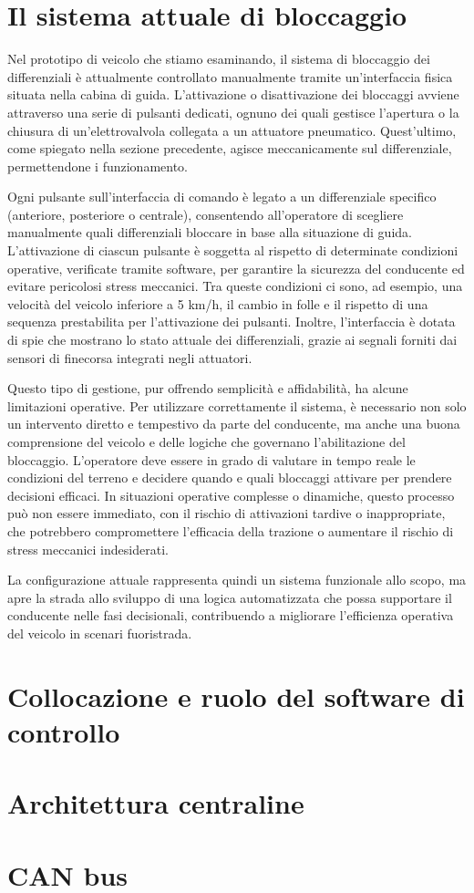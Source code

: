 \documentclass[11pt]{report}
\begin{document}
	\section{Il sistema attuale di bloccaggio}
	Nel prototipo di veicolo che stiamo esaminando, il sistema di bloccaggio dei differenziali è attualmente controllato manualmente tramite un'interfaccia fisica situata nella cabina di guida. L'attivazione o disattivazione dei bloccaggi avviene attraverso una serie di pulsanti dedicati, ognuno dei quali gestisce l'apertura o la chiusura di un'elettrovalvola collegata a un attuatore pneumatico. Quest'ultimo, come spiegato nella sezione precedente, agisce meccanicamente sul differenziale, permettendone i funzionamento.
	
	Ogni pulsante sull'interfaccia di comando è legato a un differenziale specifico (anteriore, posteriore o centrale), consentendo all'operatore di scegliere manualmente quali differenziali bloccare in base alla situazione di guida. L'attivazione di ciascun pulsante è soggetta al rispetto di determinate condizioni operative, verificate tramite software, per garantire la sicurezza del conducente ed evitare pericolosi stress meccanici. Tra queste condizioni ci sono, ad esempio, una velocità del veicolo inferiore a 5 km/h, il cambio in folle e il rispetto di una sequenza prestabilita per l'attivazione dei pulsanti. Inoltre, l'interfaccia è dotata di spie che mostrano lo stato attuale dei differenziali, grazie ai segnali forniti dai sensori di finecorsa integrati negli attuatori.
	
	Questo tipo di gestione, pur offrendo semplicità e affidabilità, ha alcune limitazioni operative. Per utilizzare correttamente il sistema, è necessario non solo un intervento diretto e tempestivo da parte del conducente, ma anche una buona comprensione del veicolo e delle logiche che governano l’abilitazione del bloccaggio. L’operatore deve essere in grado di valutare in tempo reale le condizioni del terreno e decidere quando e quali bloccaggi attivare per prendere decisioni efficaci. In situazioni operative complesse o dinamiche, questo processo può non essere immediato, con il rischio di attivazioni tardive o inappropriate, che potrebbero compromettere l’efficacia della trazione o aumentare il rischio di stress meccanici indesiderati.
	
	La configurazione attuale rappresenta quindi un sistema funzionale allo scopo, ma apre la strada allo sviluppo di una logica automatizzata che possa supportare il conducente nelle fasi decisionali, contribuendo a migliorare l’efficienza operativa del veicolo in scenari fuoristrada.
	
	
	\section{Collocazione e ruolo del software di controllo}
	
	
	
	
	
	\section{Architettura centraline}
	\section{CAN bus}
	
	
	\printbibliography


	
\end{document}
